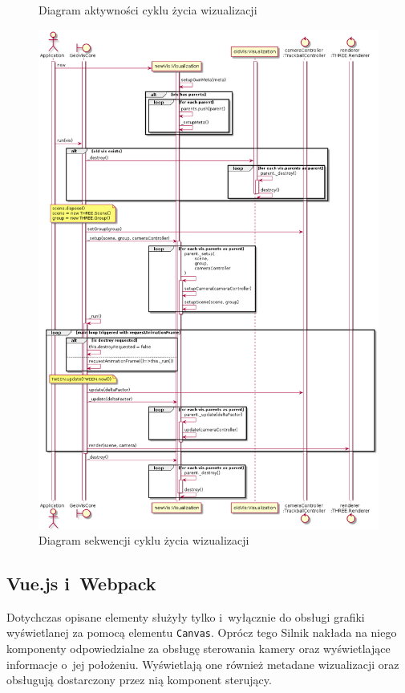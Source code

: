 \begin{figure}
    \caption{Diagram aktywności cyklu życia wizualizacji}
    \label{fig:c3_lifecycle}
\end{figure}

\begin{figure}
    \centering
    \includegraphics[width=\textwidth]{diagrams/out/c3_lifecycle_seq.png}
    \caption{Diagram sekwencji cyklu życia wizualizacji}
    \label{fig:c3_lifecycle_seq}
\end{figure}

\subsection{Vue.js i~Webpack}

Dotychczas opisane elementy służyły tylko i~wyłącznie do obsługi grafiki wyświetlanej za pomocą elementu \texttt{Canvas}. Oprócz tego Silnik nakłada na niego komponenty odpowiedzialne za obsługę sterowania kamery oraz wyświetlające informacje o~jej położeniu. Wyświetlają one również metadane wizualizacji oraz obsługują dostarczony przez nią komponent sterujący. 

